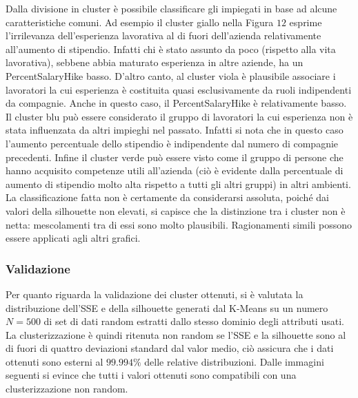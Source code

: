 \documentclass[a4paper,9pt]{article}
\begin{document}
Dalla divisione in cluster è possibile classificare gli impiegati in base ad alcune caratteristiche comuni.
Ad esempio il cluster giallo nella Figura $12$  esprime l'irrilevanza dell'esperienza lavorativa al di fuori dell'azienda relativamente all'aumento di stipendio. Infatti chi è stato assunto da poco (rispetto alla vita lavorativa), sebbene abbia maturato esperienza in altre aziende, ha un PercentSalaryHike basso.
D'altro canto, al cluster viola è plausibile associare i lavoratori la cui esperienza è costituita quasi esclusivamente da ruoli indipendenti da compagnie. Anche in questo caso, il PercentSalaryHike è relativamente basso.
Il cluster blu può essere considerato il gruppo di lavoratori la cui esperienza non è stata influenzata da altri impieghi nel passato. Infatti si nota che in questo caso l'aumento percentuale dello stipendio è indipendente dal numero di compagnie precedenti.
Infine il cluster verde può essere visto come il gruppo di persone che hanno acquisito competenze utili all'azienda (ciò è evidente dalla percentuale di aumento di stipendio molto alta rispetto a tutti gli altri gruppi) in altri ambienti.\\
La classificazione fatta non è certamente da considerarsi assoluta, poiché dai valori della silhouette non elevati, si capisce che la distinzione tra i cluster non è netta: mescolamenti tra di essi sono molto plausibili.
Ragionamenti simili possono essere applicati agli altri grafici.

\subsubsection{Validazione}
Per quanto riguarda la validazione dei cluster ottenuti, si è valutata la distribuzione dell'SSE e della silhouette generati dal K-Means su un numero $N=500$ di set di dati random estratti dallo stesso dominio degli attributi usati. La clusterizzazione è quindi ritenuta non random se l'SSE e la silhouette sono al di fuori di quattro deviazioni standard dal valor medio, ciò assicura che i dati ottenuti sono esterni al $99.994\%$  delle relative distribuzioni.
Dalle immagini seguenti si evince che tutti i valori ottenuti sono compatibili con una clusterizzazione non random.
\end{document}
